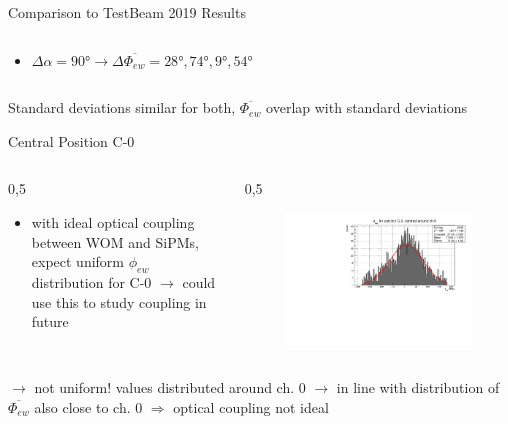 \documentclass[aspectratio=169]{beamer}
\begin{document}
\begin{frame}{Comparison to TestBeam 2019 Results}
\begin{columns}
\begin{column}{0.5\textwidth}
				\begin{itemize}
					\item $\Delta \alpha = \ang{90} \rightarrow \Delta \overline{\Phi_{ew}} = \ang{28}, \ang{74}, \ang{9}, \ang{54}$
				\end{itemize}
			\end{column}
			
		\end{columns}
		\centering
		\vspace{.1cm}
	Standard deviations similar for both, $\overline{\Phi_{ew}}$ overlap with standard deviations
		
	\end{frame}

	\begin{frame}{Central Position C-0}
		\begin{columns}
			\begin{column}{0,5\textwidth}
				\centering
				\begin{itemize}
					\item with ideal optical coupling between WOM and SiPMs, expect uniform $\phi_{ew}$ distribution for C-0 $\rightarrow$ could use this to study coupling in future
				\end{itemize}
			\end{column}
		\begin{column}{0,5\textwidth}
			\begin{figure}
				\includegraphics[width=\textwidth]{pictures/phi-ew-c0-fit.pdf}
			\end{figure}
			
			\end{column}
		\end{columns}
	$\rightarrow$ not uniform! values distributed around ch. 0 \linebreak
	$\rightarrow$ in line with distribution of $\overline{\Phi_{ew}}$ also close to ch. 0 \linebreak
	$\Rightarrow$ optical coupling not ideal
	\end{frame}
	
\end{document}
